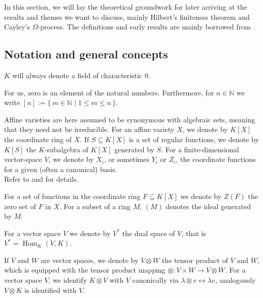 In this section, we will lay the theoretical groundwork for later arriving at the results and themes we want to discuss, mainly Hilbert's finiteness theorem and Cayley's $\Omega$-process.
The definitions and early results are mainly borrowed from \cite{DK15}.

\subsection{Notation and general concepts}

$K$ will always denote a field of characteristic $0$.

\vspace{0.1cm}
For us, zero is an element of the natural numbers.
Furthermore, for $n \in \mathbb{N}$ we write $[n] := \{\, m \in \mathbb{N} \mid 1 \leq m \leq n \,\}$.

\vspace{0.1cm}
Affine varieties are here assumed to be synonymous with algebraic sets, meaning that they need not be irreducible.
For an affine variety $X$, we denote by $K[X]$ the coordinate ring of $X$.
If $S \subseteq K[X]$ is a set of regular functions, we denote by $K[S]$ the $K$-subalgebra of $K[X]$ generated by $S$.
For a finite-dimensional vector-space $V$, we denote by $X_i$, or sometimes $Y_i$ or $Z_i$, the coordinate functions for a given (often a canonical) basis.  \\
Refer to \cite[p.~1-2]{DK15} and \cite{Gat17} for details.

\vspace{0.1cm}
For a set of functions in the coordinate ring $F \subseteq K[X]$ we denote by $Z(F)$ the zero set of $F$ in $X$. %
For a subset of a ring $M$, $(M)$ denotes the ideal generated by $M$.

\vspace{0.1cm}
For a vector space $V$ we denote by $V^\ast$ the dual space of $V$, that is \linebreak$V^\ast = \operatorname{Hom}_K(V,K)$.

\vspace{0.1cm}
If $V$ and $W$ are vector spaces, we denote by $V\otimes W$ the tensor product of $V$ and $W$, which is equipped with the tensor product mapping $\otimes \colon V\times W \rightarrow V\otimes W$.
For a vector space $V$, we identify $K \otimes V$ with $V$ canonically via $\lambda \otimes v \leftrightarrow \lambda v$, analogously $V \otimes K$ is identified with $V$.

